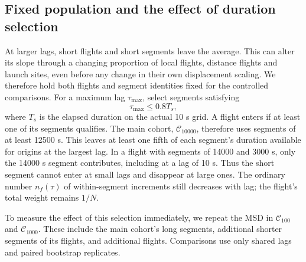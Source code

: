 \subsection{Fixed population and the effect of duration selection}
\label{sec:fixed-population}

At larger lags, short flights and short segments leave the average. This can alter
its slope through a changing proportion of local flights, distance flights and launch
sites, even before any change in their own displacement scaling. We therefore hold
both flights and segment identities fixed for the controlled comparisons.
For a maximum lag $\tau_{\max}$, select segments satisfying
\begin{equation}
 \tau_{\max}\leq0.8T_s,
 \label{eq:fixed-support}
\end{equation}
where $T_s$ is the elapsed duration on the actual 10 s grid. A flight enters if at least
one of its segments qualifies. The main cohort, $\mathcal C_{10000}$, therefore uses
segments of at least 12500 s. This leaves at least one fifth of each segment's duration
available for origins at the largest lag. In a flight with segments of 14000 and
3000 s, only the 14000 s segment contributes, including at a lag of 10 s. Thus the
short segment cannot enter at small lags and disappear at large ones. The ordinary
number $n_f(\tau)$ of within-segment increments still decreases with lag; the flight's
total weight remains $1/N$.

\begin{table}[htbp]
 \centering\small
 
 \caption{Nested duration cohorts and their site--day groups. Minimum segment
 durations are 125, 1250 and 12500 s, rounded upward when required by the 10 s grid.
 Existing cleaning and segment-admission conditions also apply. Flight and segment
 identities are retained in the numerical cohort manifests.}
 \label{tab:fixed-cohorts}
\end{table}

To measure the effect of this selection immediately, we repeat the MSD in
$\mathcal C_{100}$ and $\mathcal C_{1000}$. These include the main cohort's long segments,
additional shorter segments of its flights, and additional flights. Comparisons use
only shared lags and paired bootstrap replicates. 

